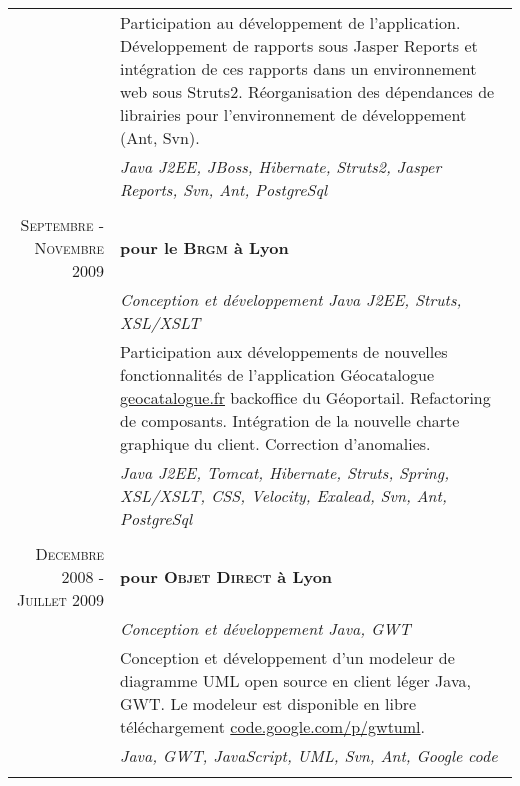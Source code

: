 \documentclass[a4paper,10pt]{article}
\begin{document}
\begin{supertabular}{r|p{11cm}}
  & \footnotesize{Participation au développement de l'application. Développement de rapports sous Jasper Reports et intégration de ces rapports dans un environnement web sous Struts2. Réorganisation des dépendances de librairies pour l'environnement de développement (Ant, Svn).} \\
  & \emph{Java J2EE, JBoss, Hibernate, Struts2, Jasper Reports, Svn, Ant, PostgreSql}                                    \\
                                                                                                     \\
  \textsc{Septembre - Novembre 2009}
  & \textbf{pour le \textsc{Brgm} à Lyon}                                                                                \\ 
  & \emph{Conception et développement Java J2EE, Struts, XSL/XSLT}                                                       \\
  & \footnotesize{Participation aux développements de nouvelles fonctionnalités de l'application Géocatalogue \href{http://www.geocatalogue.fr}{geocatalogue.fr} backoffice du Géoportail. Refactoring de composants. Intégration de la nouvelle charte graphique du client. Correction d'anomalies.} \\
  & \emph{Java J2EE, Tomcat, Hibernate, Struts, Spring, XSL/XSLT, CSS, Velocity, Exalead, Svn, Ant, PostgreSql}          \\
                                                                                                     \\
  \textsc{Decembre 2008 - Juillet 2009}
  & \textbf{pour \textsc{Objet Direct} à Lyon}                                                                           \\
  & \emph{Conception et développement Java, GWT}                                                                         \\
  & \footnotesize{Conception et développement d’un modeleur de diagramme UML open source en client léger Java, GWT. Le modeleur est disponible en libre téléchargement \href{http://code.google.com/p/gwtuml/}{code.google.com/p/gwtuml}.} \\
  & \emph{Java, GWT, JavaScript, UML, Svn, Ant, Google code}                                                             \\
                                                                                                     \\

\end{supertabular}
\end{document}
